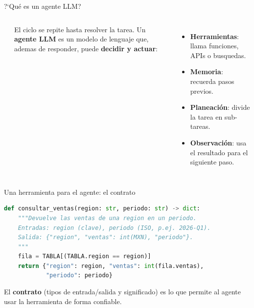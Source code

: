\documentclass[aspectratio=169]{beamer}
\begin{document}
\begin{frame}[fragile]{?`Qu\'e es un agente LLM?}
  \begin{columns}[c]
      \begin{center}
      \end{center}
      \footnotesize El ciclo se repite hasta resolver la tarea.
      Un \textbf{agente LLM} es un modelo de lenguaje que, ademas de responder,
      puede \textbf{decidir y actuar}:
      \begin{itemize}
        \item \textbf{Herramientas}: llama funciones, APIs o busquedas.
        \item \textbf{Memoria}: recuerda pasos previos.
        \item \textbf{Planeaci\'on}: divide la tarea en sub-tareas.
        \item \textbf{Observaci\'on}: usa el resultado para el siguiente paso.
      \end{itemize}
  \end{columns}
\end{frame}

\begin{frame}[fragile]{Una herramienta para el agente: el contrato}
\begin{lstlisting}[language=Python]
def consultar_ventas(region: str, periodo: str) -> dict:
    """Devuelve las ventas de una region en un periodo.
    Entradas: region (clave), periodo (ISO, p.ej. 2026-Q1).
    Salida: {"region", "ventas": int(MXN), "periodo"}.
    """
    fila = TABLA[(TABLA.region == region)]
    return {"region": region, "ventas": int(fila.ventas),
            "periodo": periodo}
\end{lstlisting}
  El \textbf{contrato} (tipos de entrada/salida y significado) es lo que permite
  al agente usar la herramienta de forma confiable.
\end{frame}
\end{document}
